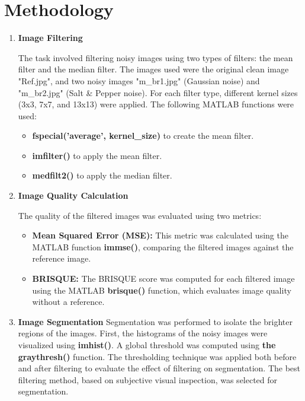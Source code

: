 \documentclass[11pt,letterpaper,twocolumn]{article}
\begin{document}
\section{Methodology}
\justify
\begin{enumerate}
    \item \textbf{Image Filtering}

The task involved filtering noisy images using two types of filters: the mean filter and the median filter. The images used were the original clean image "Ref.jpg", and two noisy images "m\_br1.jpg" (Gaussian noise) and "m\_br2.jpg" (Salt \& Pepper noise). For each filter type, different kernel sizes (3x3, 7x7, and 13x13) were applied. The following MATLAB functions were used:
\begin{itemize}
    \item \textbf{fspecial('average', kernel\_size)} to create the mean filter.\par
    \item \textbf{imfilter()} to apply the mean filter.\par
    \item \textbf{medfilt2()} to apply the median filter.\par
\end{itemize}


    \item \textbf{Image Quality Calculation}

The quality of the filtered images was evaluated using two metrics:

\begin{itemize}
    \item \textbf{Mean Squared Error (MSE):} This metric was calculated using the MATLAB function \textbf{immse()}, comparing the filtered images against the reference image.
    \item \textbf{BRISQUE:} The BRISQUE score was computed for each filtered image using the MATLAB \textbf{brisque() }function, which evaluates image quality without a reference.
\end{itemize}


\item \textbf{Image Segmentation} Segmentation was performed to isolate the brighter regions of the images. First, the histograms of the noisy images were visualized using \textbf{imhist()}. A global threshold was computed using \textbf{the graythresh()} function. The thresholding technique was applied both before and after filtering to evaluate the effect of filtering on segmentation. The best filtering method, based on subjective visual inspection, was selected for segmentation.
\end{enumerate}
\end{document}
